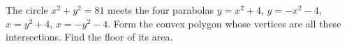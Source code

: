 The circle $x^2+y^2=81$ meets the four parabolas $y=x^2+4$, $y=-x^2-4$, $x=y^2+4$, $x=-y^2-4$. Form the convex polygon whose vertices are all these intersections. Find the floor of its area.
